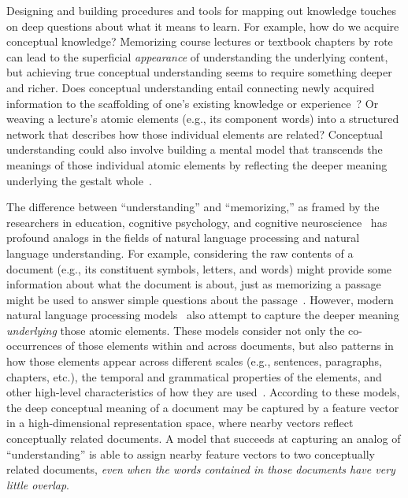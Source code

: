 \documentclass[10pt]{article}
\begin{document}
Designing and building procedures and tools for mapping out knowledge touches
on deep questions about what it means to learn. For example, how do we acquire
conceptual knowledge? Memorizing course lectures or textbook chapters by rote
can lead to the superficial \textit{appearance} of understanding the underlying
content, but achieving true conceptual understanding seems to require something
deeper and richer. Does conceptual understanding entail connecting newly
acquired information to the scaffolding of one's existing knowledge or
experience~\citep{BlayEtal06,CaraMaho03, ConsEtal16, DeacEtal04, SimoEtal04}?
Or weaving a lecture's atomic elements (e.g., its component words) into a
structured network that describes how those individual elements are related?
Conceptual understanding could also involve building a mental model that
transcends the meanings of those individual atomic elements by reflecting the
deeper meaning underlying the gestalt whole~\citep{Kint70, Macl05, ScotEtal07}.

The difference between ``understanding'' and ``memorizing,'' as framed by the
researchers in education, cognitive psychology, and cognitive
neuroscience~\citep{Kato40, Gall00, ScotEtal07, HallGree08, Macl05} has
profound analogs in the fields of natural language processing and natural
language understanding. For example, considering the raw contents of a document
(e.g., its constituent symbols, letters, and words) might provide some
information about what the document is about, just as memorizing a passage
might be used to answer simple questions about the passage~\citep[e.g., whether
it might contain words related to furniture versus physics;][]{LandDuma97,
BleiEtal03, BleiLaff06}. However, modern natural language processing
models~\citep[e.g.,][]{MikoEtal13a, CerEtal18, BrowEtal20} also attempt to
capture the deeper meaning \textit{underlying} those atomic elements. These
models consider not only the co-occurrences of those elements within and across
documents, but also patterns in how those elements appear across different
scales (e.g., sentences, paragraphs, chapters, etc.), the temporal and
grammatical properties of the elements, and other high-level characteristics of
how they are used~\citep{Mann20, Mann21a}. According to these models, the deep
conceptual meaning of a document may be captured by a feature vector in a
high-dimensional representation space, where nearby vectors reflect
conceptually related documents. A model that succeeds at capturing an analog of
``understanding'' is able to assign nearby feature vectors to two conceptually
related documents, \textit{even when the words contained in those documents
have very little overlap}.
\end{document}
